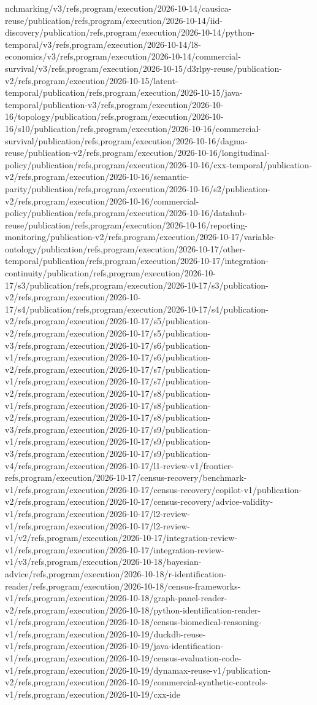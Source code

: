 \documentclass[11pt,a4paper,openany]{book}
\begin{document}
nchmarking/v3/refs,program/execution/2026-10-14/causica-reuse/publication/refs,program/execution/2026-10-14/iid-discovery/publication/refs,program/execution/2026-10-14/python-temporal/v3/refs,program/execution/2026-10-14/l8-economics/v3/refs,program/execution/2026-10-14/commercial-survival/v3/refs,program/execution/2026-10-15/d3rlpy-reuse/publication-v2/refs,program/execution/2026-10-15/latent-temporal/publication/refs,program/execution/2026-10-15/java-temporal/publication-v3/refs,program/execution/2026-10-16/topology/publication/refs,program/execution/2026-10-16/s10/publication/refs,program/execution/2026-10-16/commercial-survival/publication/refs,program/execution/2026-10-16/dagma-reuse/publication-v2/refs,program/execution/2026-10-16/longitudinal-policy/publication/refs,program/execution/2026-10-16/cxx-temporal/publication-v2/refs,program/execution/2026-10-16/semantic-parity/publication/refs,program/execution/2026-10-16/s2/publication-v2/refs,program/execution/2026-10-16/commercial-policy/publication/refs,program/execution/2026-10-16/datahub-reuse/publication/refs,program/execution/2026-10-16/reporting-monitoring/publication-v2/refs,program/execution/2026-10-17/variable-ontology/publication/refs,program/execution/2026-10-17/other-temporal/publication/refs,program/execution/2026-10-17/integration-continuity/publication/refs,program/execution/2026-10-17/s3/publication/refs,program/execution/2026-10-17/s3/publication-v2/refs,program/execution/2026-10-17/s4/publication/refs,program/execution/2026-10-17/s4/publication-v2/refs,program/execution/2026-10-17/s5/publication-v2/refs,program/execution/2026-10-17/s5/publication-v3/refs,program/execution/2026-10-17/s6/publication-v1/refs,program/execution/2026-10-17/s6/publication-v2/refs,program/execution/2026-10-17/s7/publication-v1/refs,program/execution/2026-10-17/s7/publication-v2/refs,program/execution/2026-10-17/s8/publication-v1/refs,program/execution/2026-10-17/s8/publication-v2/refs,program/execution/2026-10-17/s8/publication-v3/refs,program/execution/2026-10-17/s9/publication-v1/refs,program/execution/2026-10-17/s9/publication-v3/refs,program/execution/2026-10-17/s9/publication-v4/refs,program/execution/2026-10-17/l1-review-v1/frontier-refs,program/execution/2026-10-17/census-recovery/benchmark-v1/refs,program/execution/2026-10-17/census-recovery/copilot-v1/publication-v2/refs,program/execution/2026-10-17/census-recovery/advice-validity-v1/refs,program/execution/2026-10-17/l2-review-v1/refs,program/execution/2026-10-17/l2-review-v1/v2/refs,program/execution/2026-10-17/integration-review-v1/refs,program/execution/2026-10-17/integration-review-v1/v3/refs,program/execution/2026-10-18/bayesian-advice/refs,program/execution/2026-10-18/r-identification-reader/refs,program/execution/2026-10-18/census-frameworks-v1/refs,program/execution/2026-10-18/graph-panel-reader-v2/refs,program/execution/2026-10-18/python-identification-reader-v1/refs,program/execution/2026-10-18/census-biomedical-reasoning-v1/refs,program/execution/2026-10-19/duckdb-reuse-v1/refs,program/execution/2026-10-19/java-identification-v1/refs,program/execution/2026-10-19/census-evaluation-code-v1/refs,program/execution/2026-10-19/dynamax-reuse-v1/publication-v2/refs,program/execution/2026-10-19/commercial-synthetic-controls-v1/refs,program/execution/2026-10-19/cxx-ide
\end{document}
